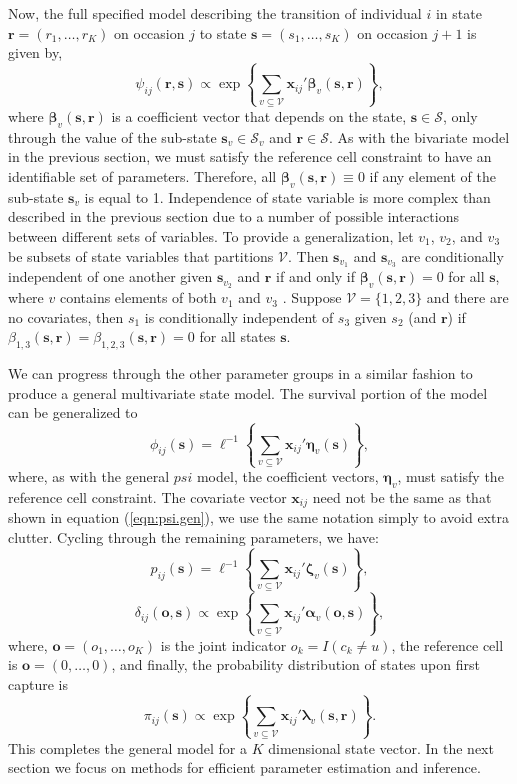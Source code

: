 \documentclass[fleqn]{article}
\newcommand{\bs}{\ensuremath{\mathbf{s}}}
\newcommand{\fS}{\ensuremath{\mathcal{S}}}
\newcommand{\br}{\ensuremath{\mathbf{r}}}
\newcommand{\bo}{\ensuremath{\mathbf{o}}}
\newcommand{\fV}{\ensuremath{\mathcal{V}}}
\newcommand{\bx}{\ensuremath{\mathbf{x}}}
\newcommand{\bb}{\ensuremath{\boldsymbol{\beta}}}
\newcommand{\ba}{\ensuremath{\boldsymbol{\alpha}}}
\newcommand{\bl}{\ensuremath{\boldsymbol{\lambda}}}
\newcommand{\bn}{\ensuremath{\boldsymbol{\eta}}}
\newcommand{\bz}{\ensuremath{\boldsymbol{\zeta}}}
\begin{document}
Now, the full specified model describing the transition of individual $i$ in state $\br = (r_1,\dots,r_K)$ on occasion $j$ to state $\bs=(s_1,\dots,s_K)$ on occasion $j+1$ is given by,
\begin{equation}
\label{eqn:psi.gen}
\psi_{ij}(\br,\bs) \propto \exp\left\{ \sum_{v\subseteq\fV}\bx_{ij}'\bb_v(\bs,\br)\right\},
\end{equation}
where $\bb_v(\bs,\br)$ is a coefficient vector that depends on the state, $\bs\in\fS$, only through the value of the sub-state $\bs_v\in\fS_v$ and $\br\in\fS$. As with the bivariate model in the previous section, we must satisfy the reference cell constraint to have an identifiable set of parameters. Therefore, all $\bb_v(\bs,\br) \equiv 0$ if any element of the sub-state $\bs_v$ is equal to 1. Independence of state variable is more complex than described in the previous section due to a number of possible interactions between different sets of variables. To provide a generalization, let $v_1$, $v_2$, and $v_3$ be subsets of state variables that partitions $\fV$. Then $\bs_{v_1}$ and $\bs_{v_3}$ are conditionally independent of one another given $\bs_{v_2}$ and $\br$ if and only if $\bb_v(\bs,\br) = 0$ for all $\bs$, where $v$ contains elements of both $v_1$ and $v_3$ \citep{Johnson:2003bh}. Suppose $\fV=\{1,2,3\}$ and there are no covariates, then $s_1$ is conditionally independent of $s_3$ given $s_2$ (and $\br$) if $\beta_{1,3}(\bs,\br) = \beta_{1,2,3}(\bs,\br)=0$ for all states $\bs$. 

We can progress through the other parameter groups in a similar fashion to produce a general multivariate state model. The survival portion of the model can be generalized to 
\begin{equation}
\phi_{ij}(\bs) = \ell^{-1}\left\{ \sum_{v\subseteq\fV}\bx_{ij}'\bn_v(\bs)\right\},
\end{equation}
where, as with the general $psi$ model, the coefficient vectors, $\bn_v$, must satisfy the reference cell constraint. The covariate vector $\bx_{ij}$ need not be the same as that shown in equation (\ref{eqn:psi.gen}), we use the same notation simply to avoid extra clutter. Cycling through the remaining parameters, we have:
\begin{equation}
p_{ij}(\bs) = \ell^{-1}\left\{ \sum_{v\subseteq\fV}\bx_{ij}'\bz_v(\bs)\right\},
\end{equation}
\begin{equation}
\delta_{ij}(\bo,\bs) \propto \exp\left\{ \sum_{v\subseteq\fV}\bx_{ij}'\ba_v(\bo,\bs)\right\},
\end{equation}
where, $\bo=(o_1,\dots,o_K)$ is the joint indicator $o_k=I(c_k\ne u)$, the reference cell is $\bo=(0,\dots,0)$, and finally, the probability distribution of states upon first capture is
\begin{equation}
\pi_{ij}(\bs)\propto \exp\left\{ \sum_{v\subseteq\fV}\bx_{ij}'\bl_v(\bs,\br)\right\}.
\end{equation}  
This completes the general model for a $K$ dimensional state vector. In the next section we focus on methods for efficient parameter estimation and inference. 
 
\end{document}
